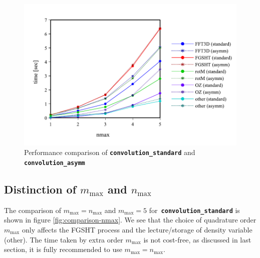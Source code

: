 \begin{figure}[H]
\begin{centering}
\includegraphics[bb=0bp 20bp 648bp 268bp,width=1\columnwidth]{_figure/results/asymm}
\par\end{centering}
\caption[Performance comparison of ``convolution\_standard'' and ``convolution\_asymm'']{Performance comparison of \texttt{\textbf{convolution\_standard}}
and \texttt{\textbf{convolution\_asymm\label{fig:comparison-asymm}}}}
\end{figure}


\subsection{Distinction of $m_{\max}$ and $n_{\max}$}

The comparison of $m_{\max}=n_{\max}$ and $m_{\max}=5$ for\texttt{\textbf{
convolution\_standard}} is shown in figure \ref{fig:comparison-nmax}.
We see that the choice of quadrature order $m_{\max}$ only affects
the \acs{FGSHT} process and the lecture/storage of density variable
(other). The time taken by extra order $m_{\max}$ is not cost-free,
as discussed in last section, it is fully recommended to use $m_{\max}=n_{\max}$.

